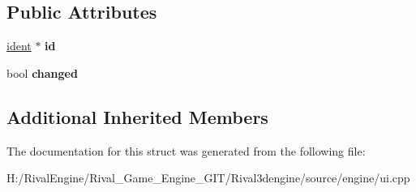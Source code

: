 \subsection*{Public Attributes}
\begin{DoxyCompactItemize}
\item 
\mbox{\label{struct_u_i_1_1_field_a1a5b197297f9079eb7b722ec3bf25b0a}} 
\hyperlink{structident}{ident} $\ast$ {\bfseries id}
\item 
\mbox{\label{struct_u_i_1_1_field_a204f89f324bb5ba87a539f784657e092}} 
bool {\bfseries changed}
\end{DoxyCompactItemize}
\subsection*{Additional Inherited Members}


The documentation for this struct was generated from the following file\+:\begin{DoxyCompactItemize}
\item 
H\+:/\+Rival\+Engine/\+Rival\+\_\+\+Game\+\_\+\+Engine\+\_\+\+G\+I\+T/\+Rival3dengine/source/engine/ui.\+cpp\end{DoxyCompactItemize}
